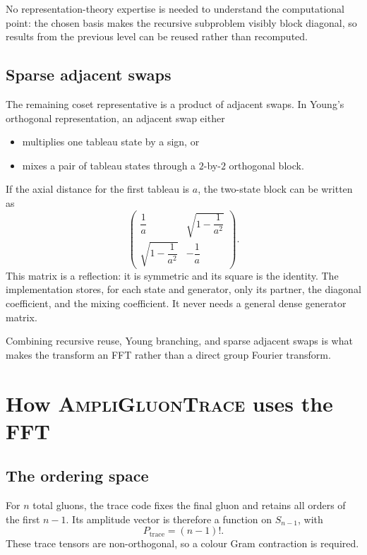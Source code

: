 \documentclass[11pt,a4paper]{article}
\begin{document}
No representation-theory expertise is needed to understand the computational
point: the chosen basis makes the recursive subproblem visibly block
diagonal, so results from the previous level can be reused rather than
recomputed.

\subsection{Sparse adjacent swaps}

The remaining coset representative is a product of adjacent swaps.  In
Young's orthogonal representation, an adjacent swap either
\begin{itemize}
  \item multiplies one tableau state by a sign, or
  \item mixes a pair of tableau states through a $2$-by-$2$ orthogonal block.
\end{itemize}
If the axial distance for the first tableau is $a$, the two-state block can
be written as
\begin{equation}
  \begin{pmatrix}
    \dfrac{1}{a} & \sqrt{1-\dfrac{1}{a^2}} \\
    \sqrt{1-\dfrac{1}{a^2}} & -\dfrac{1}{a}
  \end{pmatrix}.
\end{equation}
This matrix is a reflection: it is symmetric and its square is the identity.
The implementation stores, for each state and generator, only its partner,
the diagonal coefficient, and the mixing coefficient.  It never needs a
general dense generator matrix.

Combining recursive reuse, Young branching, and sparse adjacent swaps is what
makes the transform an FFT rather than a direct group Fourier transform.

\section{How \textsc{AmpliGluonTrace} uses the FFT}

\subsection{The ordering space}

For $n$ total gluons, the trace code fixes the final gluon and retains all
orders of the first $n-1$.  Its amplitude vector is therefore a function on
$S_{n-1}$, with
\begin{equation}
  P_{\mathrm{trace}}=(n-1)!.
\end{equation}
These trace tensors are non-orthogonal, so a colour Gram contraction is
required.
\end{document}
